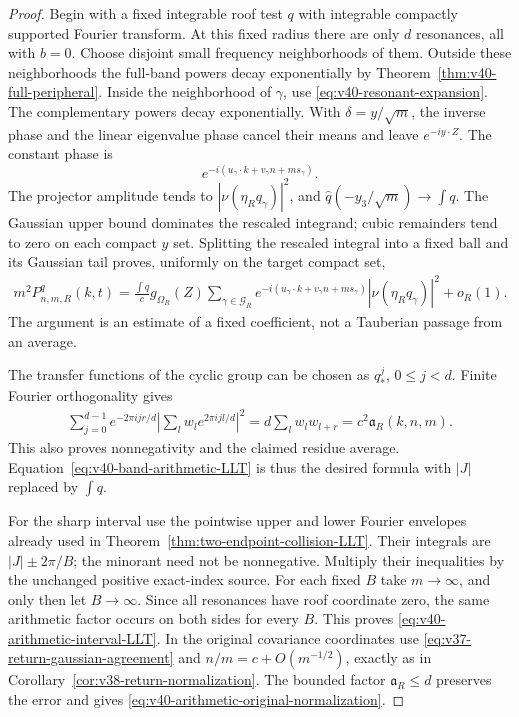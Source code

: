 \begin{proof}
Begin with a fixed integrable roof test $q$ with integrable compactly
supported Fourier transform. At this fixed radius there are only
$d$ resonances, all with $b=0$. Choose disjoint small frequency
neighborhoods of them. Outside these neighborhoods the full-band
powers decay exponentially by Theorem~\ref{thm:v40-full-peripheral}.
Inside the neighborhood of $\gamma$, use
\eqref{eq:v40-resonant-expansion}. The complementary powers decay
exponentially. With $\delta=y/\sqrt m$, the inverse phase and the
linear eigenvalue phase cancel their means and leave $e^{-iy\cdot Z}$.
The constant phase is
\[
 e^{-i(u_\gamma\cdot k+v_\gamma n+ms_\gamma)}.
\]
The projector amplitude tends to
$|\nu(\eta_Rq_\gamma)|^2$, and
$\widehat q(-y_3/\sqrt m)\to\int q$.
The Gaussian upper bound dominates the rescaled integrand; cubic
remainders tend to zero on each compact $y$ set. Splitting the
rescaled integral into a fixed ball and its Gaussian tail proves,
uniformly on the target compact set,
\begin{align}\label{eq:v40-band-arithmetic-LLT}
 m^2P^q_{n,m,R}(k,t)
   =\frac{\int q}{c}g_{\Omega_R}(Z)
       \sum_{\gamma\in\mathcal G_R}
       e^{-i(u_\gamma\cdot k+v_\gamma n+ms_\gamma)}
                   |\nu(\eta_Rq_\gamma)|^2+o_R(1).
\end{align}
The argument is an estimate of a fixed coefficient, not a Tauberian
passage from an average.

The transfer functions of the cyclic group can be chosen as
$q_*^j$, $0\le j<d$. Finite Fourier orthogonality gives
\begin{align}\label{eq:v40-finite-residue-sum}
 \sum_{j=0}^{d-1}e^{-2\pi ijr/d}
       \left|\sum_lw_l e^{2\pi ijl/d}\right|^2
       =d\sum_lw_lw_{l+r}=c^2\mathfrak a_R(k,n,m).
\end{align}
This also proves nonnegativity and the claimed residue average.
Equation~\eqref{eq:v40-band-arithmetic-LLT} is thus the desired
formula with $|J|$ replaced by $\int q$.

For the sharp interval use the pointwise upper and lower Fourier
envelopes already used in Theorem~\ref{thm:two-endpoint-collision-LLT}.
Their integrals are $|J|\pm2\pi/B$; the minorant need not be
nonnegative. Multiply their inequalities by
the unchanged positive exact-index source. For each fixed $B$ take
$m\to\infty$, and only then let $B\to\infty$. Since all resonances
have roof coordinate zero, the same arithmetic factor occurs on
both sides for every $B$. This proves
\eqref{eq:v40-arithmetic-interval-LLT}. In the original covariance
coordinates use \eqref{eq:v37-return-gaussian-agreement} and
$n/m=c+O(m^{-1/2})$, exactly as in
Corollary~\ref{cor:v38-return-normalization}. The bounded factor
$\mathfrak a_R\le d$ preserves the error and gives
\eqref{eq:v40-arithmetic-original-normalization}.


\end{proof}
